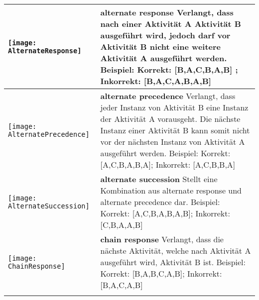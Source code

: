 \begin {table}

\begin{tabular}{|p{}|p{}|}

\hline

 \begin{center}

  \texttt{[image: AlternateResponse]} %
    \end{center} &
\textbf{alternate response} \newline  Verlangt, dass nach einer Aktivität A Aktivität B ausgeführt wird, jedoch darf vor Aktivität B nicht eine weitere Aktivität A ausgeführt werden. \newline
Beispiel: Korrekt: [B,A,C,B,A,B] ; Inkorrekt: [B,A,C,A,B,A,B] \\

\hline

\begin{center}

  \texttt{[image: AlternatePrecedence]} %
    \end{center} &
\textbf{alternate precedence}\newline
  Verlangt, dass jeder Instanz von Aktivität B eine Instanz der Aktivität A vorausgeht. Die nächste Instanz einer Aktivität B kann somit nicht vor der nächsten Instanz von Aktivität A ausgeführt werden.
  \newline
  Beispiel: Korrekt: [A,C,B,A,B,A]; Inkorrekt: [A,C,B,B,A]\\
\hline
\begin{center}

  \texttt{[image: AlternateSuccession]} %
    \end{center}&
\textbf{alternate succession} \newline
 Stellt eine Kombination aus alternate response und alternate precedence dar. \newline
  Beispiel:  Korrekt: [A,C,B,A,B,A,B]; Inkorrekt: [C,B,A,A,B] \\
\hline
\begin{center}

  \texttt{[image: ChainResponse]} %
    \end{center}&
 \textbf{chain response}\newline
  Verlangt, dass die nächste Aktivität, welche nach Aktivität A ausgeführt wird, Aktivität B ist. \newline
  Beispiel: Korrekt: [B,A,B,C,A,B]; Inkorrekt: [B,A,C,A,B]\\
\hline
\begin{center}


\end{center}
\end{tabular}
\end{table}
